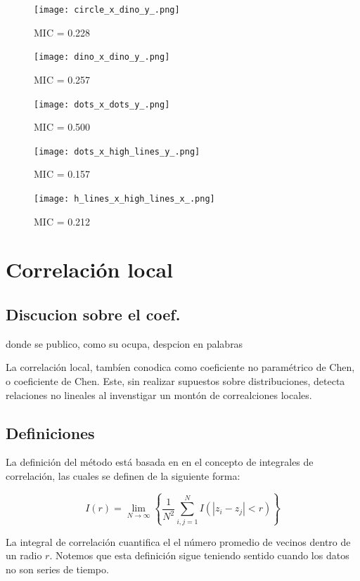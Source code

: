 		\begin{figure}[H]
		\centering
		\texttt{[image: circle\_x\_dino\_y\_.png]}
		\caption{ MIC = 0.228}
		\end{figure}
		
		\begin{figure}[H]
		\centering
		\texttt{[image: dino\_x\_dino\_y\_.png]}
		\caption{ MIC = 0.257}
		\end{figure}
		
		\begin{figure}[H]
		\centering
		\texttt{[image: dots\_x\_dots\_y\_.png]}
		\caption{ MIC = 0.500}
		\end{figure}
		
		\begin{figure}[H]
		\centering
		\texttt{[image: dots\_x\_high\_lines\_y\_.png]}
		\caption{ MIC = 0.157}
		\end{figure}
		
		\begin{figure}[H]
		\centering
		\texttt{[image: h\_lines\_x\_high\_lines\_x\_.png]}
		\caption{ MIC = 0.212}
		\end{figure}

		
\section[]{Correlaci\'on local} 


	\subsection{Discucion sobre el coef.}

	donde se publico, como su ocupa, despcion en palabras

	La correlaci\'on local, tamb\'ien conodica como coeficiente no param\'etrico de Chen, o coeficiente de Chen. Este, sin realizar supuestos sobre distribuciones, detecta relaciones no lineales al invenstigar un mont\'on de correalciones locales. 

	\subsection{Definiciones}

	La definici\'on del m\'etodo est\'a basada en en el concepto de integrales de correlaci\'on, las cuales se definen de la siguiente forma:
	\begin{defn}
		$$
		I(r)=\lim _{N \rightarrow \infty}\left\{\frac{1}{N^{2}} \sum_{i, j=1}^{N} I\left(\left|z_{i}-z_{j}\right|<r\right)\right\}
		$$
	\end{defn}
	La integral de correlaci\'on cuantifica el el n\'umero promedio de vecinos dentro de un radio $r$. Notemos que esta definici\'on sigue teniendo sentido cuando los datos no son series de tiempo.

